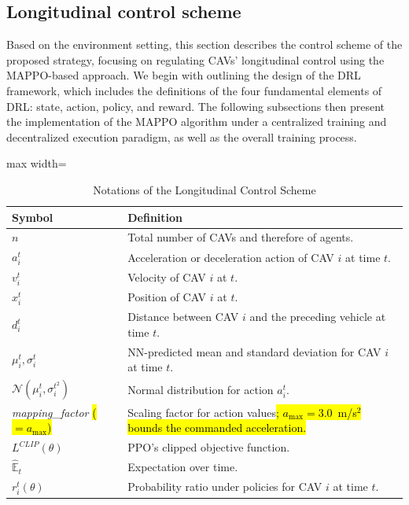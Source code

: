 \documentclass{ieeeaccess}
\begin{document}
\subsection{Longitudinal control scheme}
Based on the environment setting, this section describes the control scheme of the proposed strategy, focusing on regulating CAVs’ longitudinal control using the MAPPO-based approach. We begin with outlining the design of the DRL framework, which includes the definitions of the four fundamental elements of DRL: state, action, policy, and reward. The following subsections then present the implementation of the MAPPO algorithm under a centralized training and decentralized execution paradigm, as well as the overall training process.

\begin{table}[htbp]
\centering
\caption{Notations of the Longitudinal Control Scheme}
\label{tab:notation}
\renewcommand{\arraystretch}{1.2} %
\begin{adjustbox}{max width=\linewidth} %
\begin{tabular}{|>{\centering\arraybackslash}m{2.8cm}|>{\centering\arraybackslash}m{10.2cm}|}
\hline
\textbf{Symbol} & \textbf{Definition} \\
\hline
$n$ & Total number of CAVs and therefore of agents. \\
\hline
$a_{i}^{t}$ & Acceleration or deceleration action of CAV $i$ at time $t$. \\
\hline
$v_{i}^{t}$ & Velocity of CAV $i$ at $t$. \\
\hline
$x_{i}^{t}$ & Position of CAV $i$ at $t$. \\
\hline
$d_{i}^{t}$ & Distance between CAV $i$ and the preceding vehicle at time $t$. \\
\hline
$\mu_{i}^{t}, \sigma_{i}^{t}$ & NN-predicted mean and standard deviation for CAV $i$ at time $t$. \\
\hline
$\mathcal{N}(\mu_{i}^{t}, \sigma_{i}^{t^2})$ & Normal distribution for action $a_{i}^{t}$. \\
\hline
\textit{mapping\_factor} \hl{($=a_{\max}$)} & Scaling factor for action values\hl{; $a_{\max}=3.0$~m/s$^2$ bounds the commanded acceleration.} \\
\hline
$L^{CLIP}(\theta)$ & PPO’s clipped objective function. \\
\hline
$\hat{\mathbb{E}}_t$ & Expectation over time. \\
\hline
$r_{i}^{t}(\theta)$ & Probability ratio under policies for CAV $i$ at time $t$. \\

\end{tabular}
\end{adjustbox}
\end{table}
\end{document}
